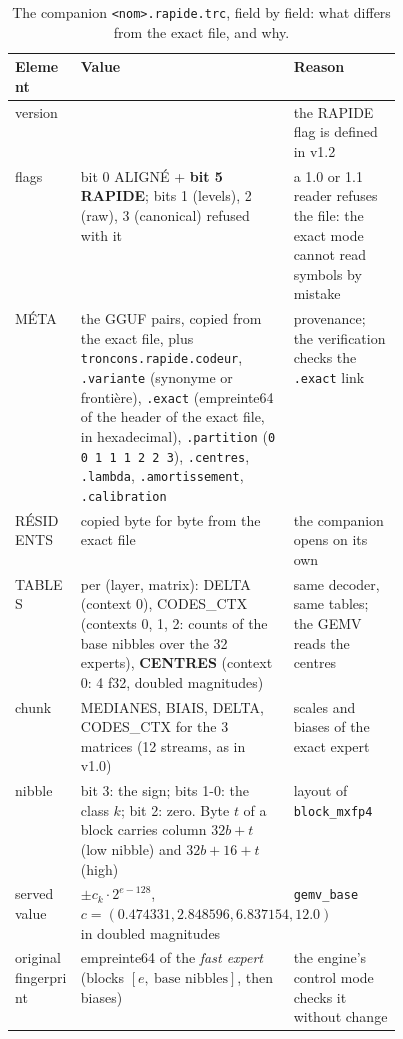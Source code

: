 \begin{table}[ht]
\centering\footnotesize
\caption[The fast companion, field by field]{The companion \texttt{<nom>.rapide.trc}, field by field: what differs from the exact file, and why.}
\label{t3sno:tab:format}
\begin{tabularx}{\linewidth}{@{}>{\raggedright\arraybackslash}p{0.17\linewidth}>{\raggedright\arraybackslash}X>{\raggedright\arraybackslash}p{0.28\linewidth}@{}}
\toprule
Element & Value & Reason \\
\midrule
version & 1.2 & the RAPIDE flag is defined in v1.2 \\
flags & bit 0 ALIGNÉ + \textbf{bit 5 RAPIDE}; bits 1 (levels), 2 (raw), 3 (canonical) refused with it & a 1.0 or 1.1 reader refuses the file: the exact mode cannot read symbols by mistake \\
MÉTA & the GGUF pairs, copied from the exact file, plus \texttt{troncons.rapide.codeur}, \texttt{.variante} (synonyme or frontière), \texttt{.exact} (empreinte64 of the header of the exact file, in hexadecimal), \texttt{.partition} (\texttt{0 0 1 1 1 2 2 3}), \texttt{.centres}, \texttt{.lambda}, \texttt{.amortissement}, \texttt{.calibration} & provenance; the verification checks the \texttt{.exact} link \\
RÉSIDENTS & copied byte for byte from the exact file & the companion opens on its own \\
TABLES & per (layer, matrix): DELTA (context 0), CODES\_CTX (contexts 0, 1, 2: counts of the base nibbles over the 32 experts), \textbf{CENTRES} (context 0: 4 f32, doubled magnitudes) & same decoder, same tables; the GEMV reads the centres \\
chunk & MEDIANES, BIAIS, DELTA, CODES\_CTX for the 3 matrices (12 streams, as in v1.0) & scales and biases of the exact expert \\
nibble & bit 3: the sign; bits 1-0: the class $k$; bit 2: zero. Byte $t$ of a block carries column $32b + t$ (low nibble) and $32b + 16 + t$ (high) & layout of \texttt{block\_mxfp4} \\
served value & $\pm c_k \cdot 2^{e - 128}$, $c = (\num{0.474331}, \num{2.848596}, \num{6.837154}, \num{12.0})$ in doubled magnitudes & \texttt{gemv\_base} \\
original fingerprint & empreinte64 of the \emph{fast expert} (blocks $[e,\ \text{base nibbles}]$, then biases) & the engine's control mode checks it without change \\
\bottomrule
\end{tabularx}
\end{table}

